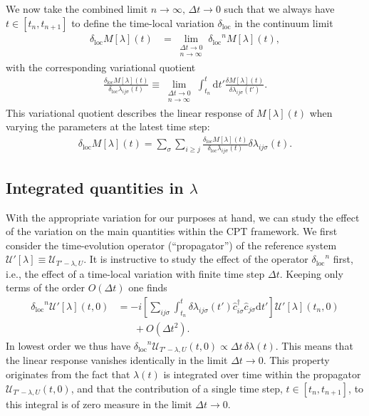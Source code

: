 \documentclass[twocolumn,prb,showpacs,aps,superscriptaddress]{revtex4}
\newcommand{\cd}[1]{\ensuremath{\hat{c}^\dagger_{#1}}}
\newcommand{\cc}[1]{\ensuremath{\hat{c}_{#1}}}
\newcommand{\dt}[0]{\ensuremath{\mathrm{d}t}}
\newcommand{\deltaloc}[0]{\ensuremath{\delta_\mathrm{loc}}}
\begin{document}
We now take the combined limit $n\rightarrow\infty,\, \Delta t \rightarrow 0$ 
such that we always have $t \in [t_n, t_{n+1}]$ to define the time-local
variation $\deltaloc$ in the continuum limit 
\begin{align}
  \deltaloc M[\lambda](t)
  &= 
  \lim_{\substack{\Delta t \rightarrow 0 \\ n\rightarrow \infty}}
  \deltaloc^n M[\lambda](t),
\end{align}
with the corresponding variational quotient
\begin{align}
  \frac{\deltaloc M[\lambda](t)}{\deltaloc \lambda_{ij\sigma}(t)}
  \equiv
  \lim_{\substack{\Delta t \rightarrow 0 \\ n\rightarrow \infty}}
  \int_{t_n}^t \dt'
  \frac{\delta M[\lambda](t)}{\delta \lambda_{ij\sigma}(t')}.
\end{align}
This variational quotient describes the linear response of $M[\lambda](t)$ when
varying the parameters at the latest time step:
\begin{align}
  \deltaloc M[\lambda](t)
  =
  \sum_{\sigma}\sum_{i \ge j}
  \frac{\deltaloc M[\lambda](t)}{\deltaloc \lambda_{ij\sigma}(t)}
  \delta\lambda_{ij\sigma}(t).
\end{align}

\subsection{Integrated quantities in $\lambda$}
\label{sec:b}

With the appropriate variation for our purposes at hand, we can study the
effect of the variation on the main quantities within the CPT framework.  We
first consider the time-evolution operator (``propagator'') of the reference
system $\mathcal{U}'[\lambda]\equiv \mathcal{U}_{T'-\lambda, U}$.  It is
instructive to study the effect of the operator $\deltaloc^n$ first, i.e., the
effect of a time-local variation with finite time step $\Delta t$. Keeping only
terms of the order $O(\Delta t)$ one finds
\begin{align}
  \deltaloc^n \mathcal{U}'[\lambda](t,0)
  &= 
  -i 
  \left[
    \sum_{ij\sigma} 
    \int_{t_n}^{t}
    \delta\lambda_{ij\sigma}(t') \cd{i\sigma}\cc{j\sigma} \dt'
  \right]
  \mathcal{U}'[\lambda](t_n,0)\nonumber\\
  &\phantom{=}\,\,+ 
  O(\Delta t^2).
  \label{eq:dU_vanishes}
\end{align}
In lowest order we thus have $\deltaloc^n \mathcal{U}_{T' - \lambda,U}(t,0)
\propto \Delta t \, \delta \lambda(t)$.  This means that the linear response
vanishes identically in the limit $\Delta t \rightarrow 0$. This property
originates from the fact that $\lambda(t)$ is integrated over time within the
propagator $\mathcal{U}_{T' - \lambda, U}(t,0)$, and that the contribution of a
single time step, $t \in [t_n, t_{n+1}]$, to this integral is of zero measure
in the limit $\Delta t \rightarrow 0$. 
\end{document}
